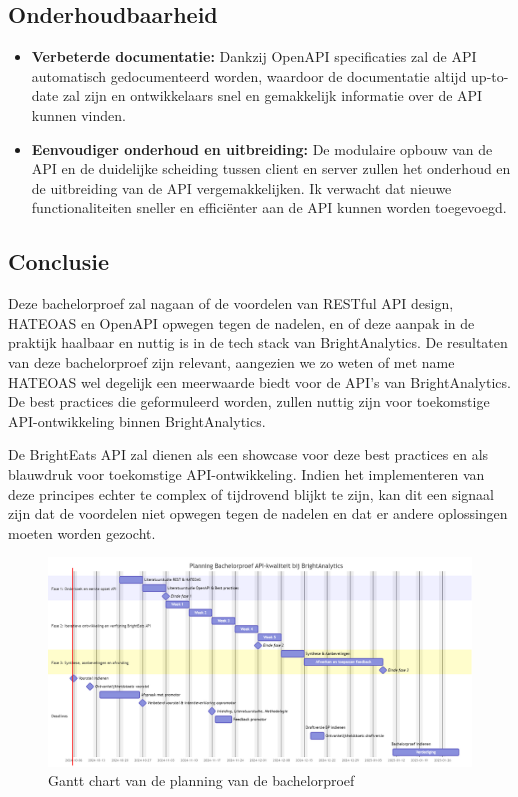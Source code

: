 \subsection{Onderhoudbaarheid}

\begin{itemize}
    \item \textbf{Verbeterde documentatie:} Dankzij OpenAPI specificaties zal de API automatisch gedocumenteerd worden, waardoor de documentatie altijd up-to-date zal zijn en ontwikkelaars snel en gemakkelijk informatie over de API kunnen vinden.
    \item \textbf{Eenvoudiger onderhoud en uitbreiding:} De modulaire opbouw van de API en de duidelijke scheiding tussen client en server zullen het onderhoud en de uitbreiding van de API vergemakkelijken. Ik verwacht dat nieuwe functionaliteiten sneller en efficiënter aan de API kunnen worden toegevoegd.
\end{itemize}

\subsection{Conclusie}

Deze bachelorproef zal nagaan of de voordelen van RESTful API design, HATEOAS en OpenAPI opwegen tegen de nadelen, en of deze aanpak in de praktijk haalbaar en nuttig is in de tech stack van BrightAnalytics. De resultaten van deze bachelorproef zijn relevant, aangezien we zo weten of met name HATEOAS wel degelijk een meerwaarde biedt voor de API's van BrightAnalytics. De best practices die geformuleerd worden, zullen nuttig zijn voor toekomstige API-ontwikkeling binnen BrightAnalytics.

De BrightEats API zal dienen als een showcase voor deze best practices en als blauwdruk voor toekomstige API-ontwikkeling. Indien het implementeren van deze principes echter te complex of tijdrovend blijkt te zijn, kan dit een signaal zijn dat de voordelen niet opwegen tegen de nadelen en dat er andere oplossingen moeten worden gezocht.

\clearpage

\begin{figure}[H]
  \centering
  \includegraphics[width=\textwidth, keepaspectratio]{gantt-chart/gantt-chart.png}
  \caption{Gantt chart van de planning van de bachelorproef}
  \label{fig:gantt-chart}
\end{figure}
